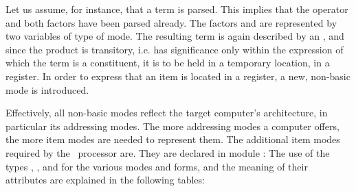 Let us assume, for instance, that a term  is parsed. This implies that the operator and both factors have been parsed already. The factors  and  are represented by two variables of type  of  mode. The resulting term is again described by an , and since the product is transitory, i.e. has significance only within the expression of which the term is a constituent, it is to be held in a temporary location, in a register. In order to express that an item is located in a register, a new, non-basic mode  is introduced.

Effectively, all non-basic modes reflect the target computer's architecture, in particular its addressing modes. The more addressing modes a computer offers, the more item modes are needed to represent them. The additional item modes required by the \RISC\ processor are. They are declared in module :
The use of the types , , and  for the various modes and forms, and the meaning of their attributes are explained in the following tables:
\eject
{}

